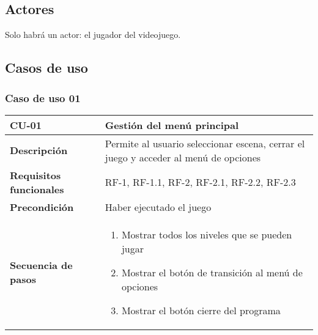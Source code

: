 \subsection{Actores}
Solo habrá un actor: el jugador del videojuego.
\subsection{Casos de uso}

\subsubsection{Caso de uso 01}

\begin{tabularx}{\columnwidth}{l|l}
\begin{minipage}{0.25\columnwidth}
\textbf{CU-01} 
\end{minipage}
&
\begin{minipage}{0.65\columnwidth}
Gestión del menú principal
\end{minipage}
\\ \hline

\begin{minipage}{0.25\columnwidth}
\textbf{Descripción} 
\end{minipage}
&
\begin{minipage}{0.65\columnwidth}
Permite al usuario seleccionar escena, cerrar el juego y acceder al menú de opciones
\end{minipage}
\\ \hline

\begin{minipage}{0.25\columnwidth}
\textbf{Requisitos funcionales} 
\end{minipage}
&
\begin{minipage}{0.65\columnwidth}
RF-1, RF-1.1, RF-2, RF-2.1, RF-2.2, RF-2.3                                                                                                                    
\end{minipage}
\\ \hline

\begin{minipage}{0.25\columnwidth}
\textbf{Precondición} 
\end{minipage}
&
\begin{minipage}{0.65\columnwidth}
Haber ejecutado el juego
\end{minipage}
\\ \hline

\begin{minipage}{0.25\columnwidth}
\textbf{Secuencia de pasos} 
\end{minipage}
&
\begin{minipage}{0.65\columnwidth}
\begin{enumerate}
\item
Mostrar todos los niveles que se pueden jugar
\item
Mostrar el botón de transición al menú de opciones
\item
Mostrar el botón cierre del programa
\end{enumerate}
\end{minipage}
\\ \hline


\end{tabularx}
